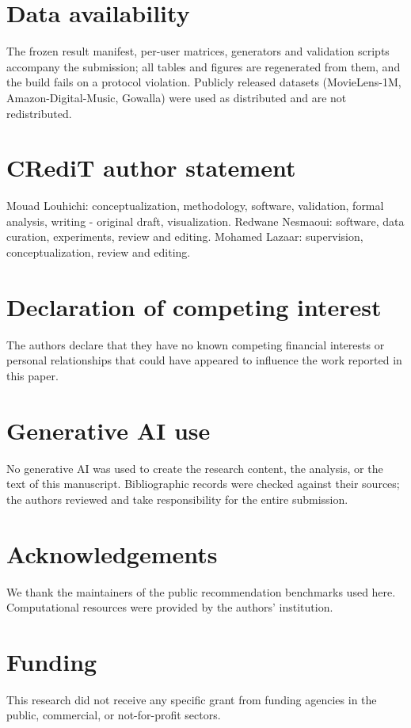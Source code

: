 \section*{Data availability}
The frozen result manifest, per-user matrices, generators and validation scripts accompany the submission; all tables and figures are regenerated from them, and the build fails on a protocol violation. Publicly released datasets (MovieLens-1M, Amazon-Digital-Music, Gowalla) were used as distributed and are not redistributed.

\section*{CRediT author statement}
Mouad Louhichi: conceptualization, methodology, software, validation, formal analysis, writing - original draft, visualization. Redwane Nesmaoui: software, data curation, experiments, review and editing. Mohamed Lazaar: supervision, conceptualization, review and editing.

\section*{Declaration of competing interest}
The authors declare that they have no known competing financial interests or personal relationships that could have appeared to influence the work reported in this paper.

\section*{Generative AI use}
No generative AI was used to create the research content, the analysis, or the text of this manuscript. Bibliographic records were checked against their sources; the authors reviewed and take responsibility for the entire submission.

\section*{Acknowledgements}
We thank the maintainers of the public recommendation benchmarks used here. Computational resources were provided by the authors' institution.

\section*{Funding}
This research did not receive any specific grant from funding agencies in the public, commercial, or not-for-profit sectors.

